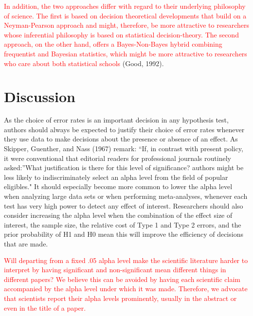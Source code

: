 \documentclass[
  english,
  ,man, a4paper,floatsintext]{apa6}
\begin{document}
\textcolor{red}{In addition, the two approaches differ with regard to their underlying philosophy of science. The first is based on decision theoretical developments that build on a Neyman-Pearson approach and might, therefore, be more attractive to researchers whose inferential philosophy is based on statistical decision-theory. The second approach, on the other hand, offers a Bayes-Non-Bayes hybrid combining frequentist and Bayesian statistics, which might be more attractive to researchers who care about both statistical schools} (Good, 1992).

\hypertarget{discussion}{%
\section{Discussion}\label{discussion}}

As the choice of error rates is an important decision in any hypothesis test, authors should always be expected to justify their choice of error rates whenever they use data to make decisions about the presence or absence of an effect. As Skipper, Guenther, and Nass (1967) remark: ``If, in contrast with present policy, it were conventional that editorial readers for professional journals routinely asked:''What justification is there for this level of significance? authors might be less likely to indiscriminately select an alpha level from the field of popular eligibles." It should especially become more common to lower the alpha level when analyzing large data sets or when performing meta-analyses, whenever each test has very high power to detect any effect of interest. Researchers should also consider increasing the alpha level when the combination of the effect size of interest, the sample size, the relative cost of Type 1 and Type 2 errors, and the prior probability of H1 and H0 mean this will improve the efficiency of decisions that are made.

\textcolor{red}{Will departing from a fixed .05 alpha level make the scientific literature harder to interpret by having significant and non-significant mean different things in different papers? We believe this can be avoided by having each scientific claim accompanied by the alpha level under which it was made. Therefore, we advocate that scientists report their alpha levels prominently, usually in the abstract or even in the title of a paper.}
\end{document}
